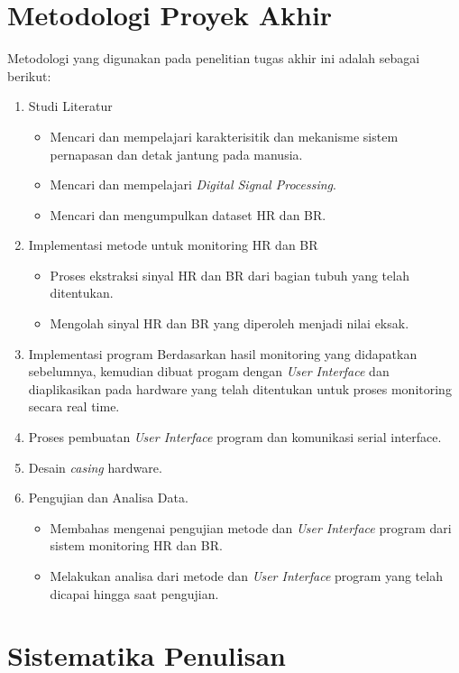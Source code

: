 \section{Metodologi Proyek Akhir}  %
Metodologi yang digunakan pada penelitian tugas akhir ini adalah sebagai berikut:
\begin{enumerate}
 \item Studi Literatur
 \begin{itemize}
 \item Mencari dan mempelajari karakterisitik dan mekanisme sistem pernapasan dan detak jantung pada manusia.
    \item Mencari dan mempelajari \textit{Digital Signal Processing}.
   \item Mencari dan mengumpulkan dataset HR dan BR.
 \end{itemize}
 \item Implementasi metode untuk monitoring HR dan BR
 \begin{itemize}
 \item Proses ekstraksi sinyal HR dan BR dari bagian tubuh yang telah ditentukan.
    \item Mengolah sinyal HR dan BR yang diperoleh menjadi nilai eksak.
 \end{itemize}
\item Implementasi program 
 Berdasarkan hasil monitoring yang didapatkan sebelumnya, kemudian dibuat progam dengan \textit{User Interface} dan diaplikasikan pada hardware yang telah ditentukan untuk proses monitoring secara real time. 
 \item Proses pembuatan \textit{User Interface} program dan komunikasi serial interface.
\item Desain \textit{casing} hardware.
 \item Pengujian dan Analisa Data.
 \begin{itemize}
    \item Membahas mengenai pengujian metode dan \textit{User Interface} program dari sistem monitoring HR dan BR. 
    \item Melakukan analisa dari metode dan \textit{User Interface} program yang telah dicapai hingga saat pengujian.
 \end{itemize}
\end{enumerate}


\section{Sistematika Penulisan}  %

